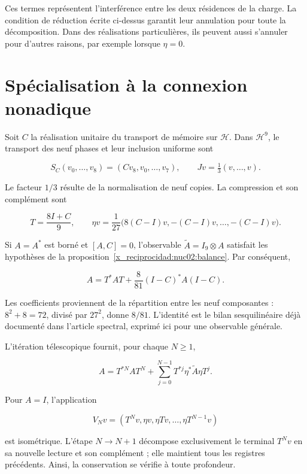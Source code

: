 Ces termes représentent l’interférence entre les deux résidences de la charge. La condition de réduction écrite ci-dessus garantit leur annulation pour toute la décomposition. Dans des réalisations particulières, ils peuvent aussi s’annuler pour d’autres raisons, par exemple lorsque \(\eta=0\).

\section{Spécialisation à la connexion nonadique}

Soit \(C\) la réalisation unitaire du transport de mémoire sur \(\mathcal H\). Dans \(\mathcal H^9\), le transport des neuf phases et leur inclusion uniforme sont

\[
S_C(v_0,\ldots,v_8)=(Cv_8,v_0,\ldots,v_7),
\qquad Jv=\tfrac13(v,\ldots,v).
\]

Le facteur \(1/3\) résulte de la normalisation de neuf copies. La compression et son complément sont

\[
T=\frac{8I+C}{9},\qquad
\eta v=\frac1{27}\bigl(8(C-I)v,-(C-I)v,\ldots,-(C-I)v\bigr).
\]

Si \(A=A^*\) est borné et \([A,C]=0\), l’observable \(\widetilde A=I_9\otimes A\) satisfait les hypothèses de la proposition~\ref{x_reciprocidad:nuc02:balance}. Par conséquent,

\begin{equation}
\boxed{A=T^*AT+\frac8{81}(I-C)^*A(I-C).}\label{x_reciprocidad:nuc02:eq:2}
\end{equation}

Les coefficients proviennent de la répartition entre les neuf composantes : \(8^2+8=72\), divisé par \(27^2\), donne \(8/81\). L’identité est le bilan sesquilinéaire déjà documenté dans l’article spectral, exprimé ici pour une observable générale.

L’itération télescopique fournit, pour chaque \(N\geq1\),

\begin{equation}
A=T^{*N}AT^N+
\sum_{j=0}^{N-1}T^{*j}\eta^*\widetilde A\eta T^j.\label{x_reciprocidad:nuc02:eq:3}
\end{equation}

Pour \(A=I\), l’application

\[
V_Nv=(T^Nv,\eta v,\eta Tv,\ldots,\eta T^{N-1}v)
\]

est isométrique. L’étape \(N\to N+1\) décompose exclusivement le terminal \(T^Nv\) en sa nouvelle lecture et son complément ; elle maintient tous les registres précédents. Ainsi, la conservation se vérifie à toute profondeur.

